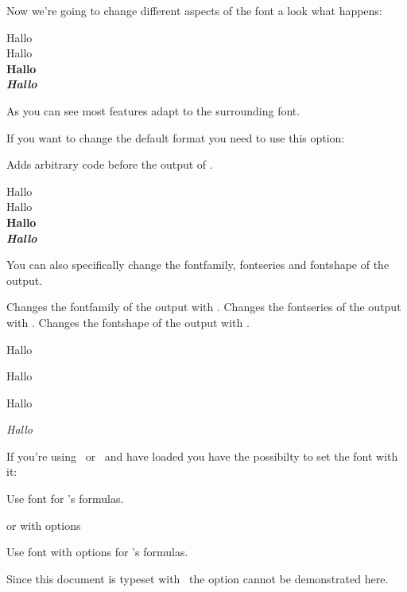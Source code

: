 \documentclass[load-preamble+]{cnltx-doc}
\begin{document}
Now we're going to change different aspects of the font a look what happens:
\begin{example}[pre-output={\biolinumLF\libertineLF\setchemformula{format=}}]
  \sffamily Hallo \sample \\
  \ttfamily Hallo \sample \normalfont \\
  \bfseries Hallo \sample \normalfont \\
  \itshape Hallo \sample
\end{example}
As you can see most features adapt to the surrounding font.

If you want to change the default format you need to use this option:
\begin{options}
  \Default
    Adds arbitrary code before the output of .
\end{options}
\begin{example}[pre-output={\biolinumLF\libertineLF\setchemformula{format=}}]
  \sffamily Hallo \sample \\
  \ttfamily Hallo \sample \normalfont \\
  \bfseries Hallo \sample \normalfont \\
  \itshape Hallo \sample
\end{example}

You can also specifically change the fontfamily, fontseries and fontshape of
the output.
\begin{options}
  \Default
    Changes the fontfamily of the output with .
  \Default
    Changes the fontseries of the output with .
  \Default
    Changes the fontshape of the output with .
\end{options}
\begin{example}[pre-output={\biolinumLF\libertineLF\setchemformula{format=}}]
  Hallo \sample \par
  \sffamily Hallo \sample \normalfont \par
   Hallo \sample
    \normalfont \par
  \itshape Hallo \sample
\end{example}

If you're using \XeLaTeX\ or \LuaLaTeX\ and have loaded  you
have the possibilty to set the font with it:
\begin{options}
  \Default
    Use font  for \chemformula's formulas.
\end{options}
or with options
\begin{options}
    Use font  with options  for \chemformula's
    formulas.
\end{options}
Since this document is typeset with \pdfLaTeX\ the option cannot be
demonstrated here.
\end{document}
